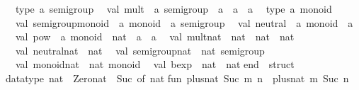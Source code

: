\begin{isabellebody}
\begin{isamarkuptext}
\ \ type\ {}a\ semigroup\isanewline
\ \ val\ mult\ {}\ {}a\ semigroup\ {}{}\ {}a\ {}{}\ {}a\ {}{}\ {}a\isanewline
\ \ type\ {}a\ monoid\isanewline
\ \ val\ semigroup{}monoid\ {}\ {}a\ monoid\ {}{}\ {}a\ semigroup\isanewline
\ \ val\ neutral\ {}\ {}a\ monoid\ {}{}\ {}a\isanewline
\ \ val\ pow\ {}\ {}a\ monoid\ {}{}\ nat\ {}{}\ {}a\ {}{}\ {}a\isanewline
\ \ val\ mult{}nat\ {}\ nat\ {}{}\ nat\ {}{}\ nat\isanewline
\ \ val\ neutral{}nat\ {}\ nat\isanewline
\ \ val\ semigroup{}nat\ {}\ nat\ semigroup\isanewline
\ \ val\ monoid{}nat\ {}\ nat\ monoid\isanewline
\ \ val\ bexp\ {}\ nat\ {}{}\ nat\isanewline
end\ {}\ struct\isanewline
\isanewline
datatype\ nat\ {}\ Zero{}nat\ {}\ Suc\ of\ nat{}\isanewline
\isanewline
fun\ plus{}nat\ {}Suc\ m{}\ n\ {}\ plus{}nat\ m\ {}Suc\ n{}\isanewline

\end{isamarkuptext}
\end{isabellebody}
